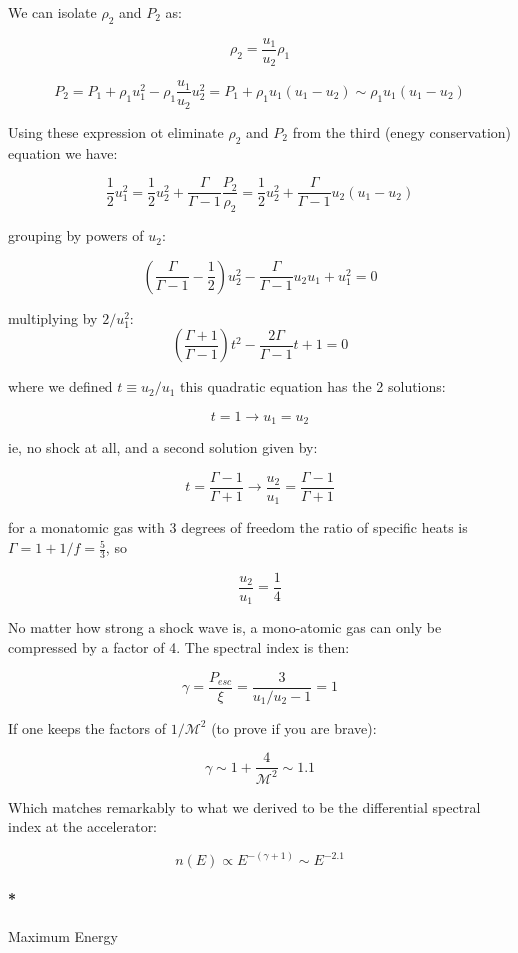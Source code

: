 \documentclass[
  letterpaper,
  DIV=11,
  numbers=noendperiod]{scrreprt}
\let\oldparagraph\paragraph
\renewcommand{\paragraph}[1]{\oldparagraph{#1}\mbox{}}
\begin{document}
We can isolate \(\rho_2\) and \(P_2\) as:

\[\rho_2 = \frac{u_1}{u_2} \rho_1\]

\[P_2 = P_1 + \rho_1 u_1^2 - \rho_1 \frac{u_1}{u_2}u_2^2 = P_1 + \rho_1 u_1 (u_1 - u_2) \sim \rho_1 u_1 (u_1 - u_2)\]

Using these expression ot eliminate \(\rho_2\) and \(P_2\) from the
third (enegy conservation) equation we have:

\[\frac{1}{2}u_1^2 = \frac{1}{2}u_2^2 + \frac{\Gamma}{\Gamma -1}\frac{P_2}{\rho_2} = \frac{1}{2}u_2^2 + \frac{\Gamma}{\Gamma -1} u_2 (u_1 - u_2)\]

grouping by powers of \(u_2\):

\[\left(\frac{\Gamma}{\Gamma -1} - \frac{1}{2}\right) u_2^2 - \frac{\Gamma}{\Gamma -1} u_2u_1 + u_1^2 = 0 \]

multiplying by \(2/u_1^2\):
\[\left(\frac{\Gamma + 1 }{\Gamma -1}\right) t^2 - \frac{2\Gamma}{\Gamma -1} t + 1 = 0\]

where we defined \(t \equiv u_2/u_1\) this quadratic equation has the 2
solutions:

\[ t = 1 \rightarrow u_1 = u_2\]

ie, no shock at all, and a second solution given by:

\[ t = \frac{\Gamma - 1}{\Gamma + 1} \rightarrow \frac{u_2}{u_1} = \frac{\Gamma - 1}{\Gamma +1}\]

for a monatomic gas with 3 degrees of freedom the ratio of specific
heats is \(\Gamma = 1 + 1/f = \frac{5}{3}\), so

\[\frac{u_2}{u_1} = \frac{1}{4}\]

No matter how strong a shock wave is, a mono-atomic gas can only be
compressed by a factor of 4. The spectral index is then:

\[\gamma = \frac{P_{esc}}{\xi} = \frac{3}{u_1/u_2 -1} = 1\]

If one keeps the factors of \(1/\mathcal{M}^2\) (to prove if you are
brave):

\[\gamma \sim 1 + \frac{4}{\mathcal{M}^2} \sim 1.1\]

Which matches remarkably to what we derived to be the differential
spectral index at the accelerator:

\[ n(E) \propto E^{-(\gamma+1)} \sim E^{-2.1} \]

\paragraph*{Maximum Energy}\label{maximum-energy}
\end{document}
